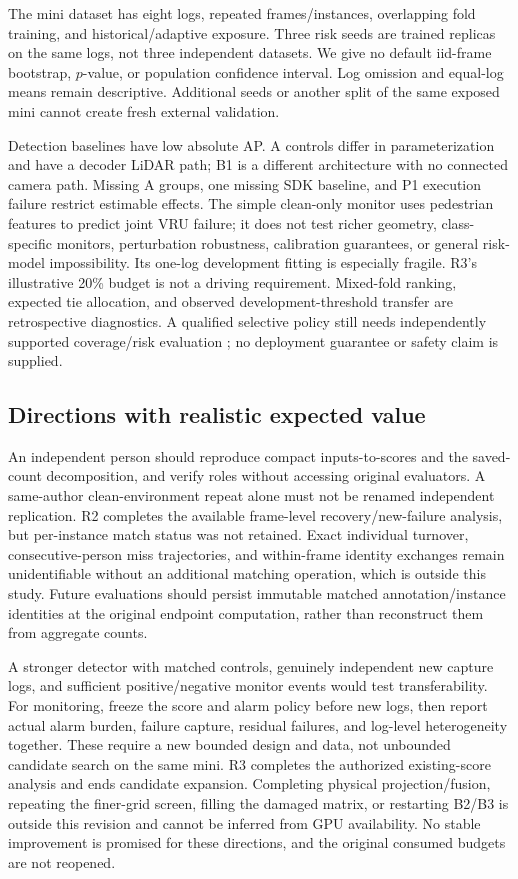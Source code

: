 \documentclass[conference]{IEEEtran}
\begin{document}
The mini dataset has eight logs, repeated frames/instances, overlapping fold training, and historical/adaptive exposure. Three risk seeds are trained replicas on the same logs, not three independent datasets. We give no default iid-frame bootstrap, $p$-value, or population confidence interval. Log omission and equal-log means remain descriptive. Additional seeds or another split of the same exposed mini cannot create fresh external validation.

Detection baselines have low absolute AP. A controls differ in parameterization and have a decoder LiDAR path; B1 is a different architecture with no connected camera path. Missing A groups, one missing SDK baseline, and P1 execution failure restrict estimable effects. The simple clean-only monitor uses pedestrian features to predict joint VRU failure; it does not test richer geometry, class-specific monitors, perturbation robustness, calibration guarantees, or general risk-model impossibility. Its one-log development fitting is especially fragile. R3's illustrative 20\% budget is not a driving requirement. Mixed-fold ranking, expected tie allocation, and observed development-threshold transfer are retrospective diagnostics. A qualified selective policy still needs independently supported coverage/risk evaluation \cite{Geifman2017Selective}; no deployment guarantee or safety claim is supplied.

\subsection{Directions with realistic expected value}
An independent person should reproduce compact inputs-to-scores and the saved-count decomposition, and verify roles without accessing original evaluators. A same-author clean-environment repeat alone must not be renamed independent replication. R2 completes the available frame-level recovery/new-failure analysis, but per-instance match status was not retained. Exact individual turnover, consecutive-person miss trajectories, and within-frame identity exchanges remain unidentifiable without an additional matching operation, which is outside this study. Future evaluations should persist immutable matched annotation/instance identities at the original endpoint computation, rather than reconstruct them from aggregate counts.

A stronger detector with matched controls, genuinely independent new capture logs, and sufficient positive/negative monitor events would test transferability. For monitoring, freeze the score and alarm policy before new logs, then report actual alarm burden, failure capture, residual failures, and log-level heterogeneity together. These require a new bounded design and data, not unbounded candidate search on the same mini. R3 completes the authorized existing-score analysis and ends candidate expansion. Completing physical projection/fusion, repeating the finer-grid screen, filling the damaged matrix, or restarting B2/B3 is outside this revision and cannot be inferred from GPU availability. No stable improvement is promised for these directions, and the original consumed budgets are not reopened.
\end{document}
